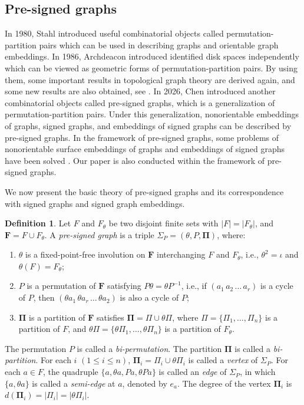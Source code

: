 \documentclass[12pt]{article}
\theoremstyle{definition}
\newtheorem{definition}[theorem]{Definition}
\begin{document}
\subsection{Pre-signed graphs}
In 1980, Stahl \cite{Stahl1980} introduced useful combinatorial objects called permutation-partition pairs which can be used in describing  graphs and orientable graph embeddings. In 1986, Archdeacon \cite{Archdeacon86-1,Archdeacon86-2} introduced identified disk spaces independently which can be viewed as geometric forms of permutation-partition pairs. By using them, some important results in topological graph theory are derived again, and some new results are also obtained, see \cite{Archdeacon86-1,Archdeacon86-2,Archdeacon98,Bonnington94-1,Bonnington94-2,Stahl1980,Stahl1982,Stahl1983,Stahl1988,Stahl1991}. In 2026, Chen \cite{Chen2026PreSigned} introduced another combinatorial objects called pre-signed graphs, which is a generalization of permutation-partition pairs. Under this generalization, nonorientable embeddings of graphs, signed graphs, and embeddings of signed graphs can be described by pre-signed graphs. In the framework of pre-signed graphs, some problems of nonorientable surface embeddings of graphs and embeddings of signed graphs have been solved \cite{Chen2026PreSigned,Chen2026PreSigned01}.
Our paper is also conducted within the framework of pre-signed graphs.



We now present the basic theory of pre-signed graphs and its correspondence with signed graphs and signed graph embeddings.
\begin{definition}
Let $F$ and $F_{\theta}$ be two disjoint finite sets with $|F|=|F_{\theta}|$, and $\mathbf F=F\cup F_{\theta}$. A \emph{pre-signed graph} is a triple $\Sigma_P=(\theta,P,\mathbf{\Pi})$, where:
\begin{enumerate}[label=(\arabic*)]
\item $\theta$ is a fixed-point-free involution on $\mathbf F$ interchanging $F$ and $F_{\theta}$, i.e., $\theta^2=\iota$ and $\theta(F)=F_{\theta}$;
\item $P$ is a permutation of $\mathbf F$ satisfying $P\theta=\theta P^{-1}$, i.e., if $(a_1\,a_2\,\ldots\,a_r)$ is a cycle of $P$, then $(\theta a_1\,\theta a_r\,\ldots\,\theta a_2)$ is also a cycle of $P$;
\item $\mathbf{\Pi}$ is a partition of $\mathbf F$ satisfies
$\mathbf{\Pi}=\Pi\cup\theta\Pi$, where $\Pi=\{\Pi_1,\ldots,\Pi_n\}$ is a partition of $F$, and $\theta\Pi=\{\theta\Pi_1,\ldots,\theta\Pi_n\}$ is a partition of $F_{\theta}$.
\end{enumerate}
The permutation $P$ is called a \emph{bi-permutation}.
The partition $\mathbf{\Pi}$ is called a \emph{bi-partition}.
For each $i$ $(1\leq i\leq n)$, $\mathbf{\Pi}_i=\Pi_i\cup\theta\Pi_i$ is called a {\it vertex} of $\Sigma_P$. For each $a\in F$, the quadruple $\{a, \theta a, Pa, \theta Pa \}$ is called an {\it edge} of $\Sigma_P$, in which $\{a, \theta a\}$ is called a {\it semi-edge} at $a$, denoted by $e_a$.
The degree of the vertex $\mathbf{\Pi}_i$ is $d(\mathbf{\Pi}_i)=|\Pi_i|=|\theta\Pi_i|$.
\end{definition}
\end{document}
